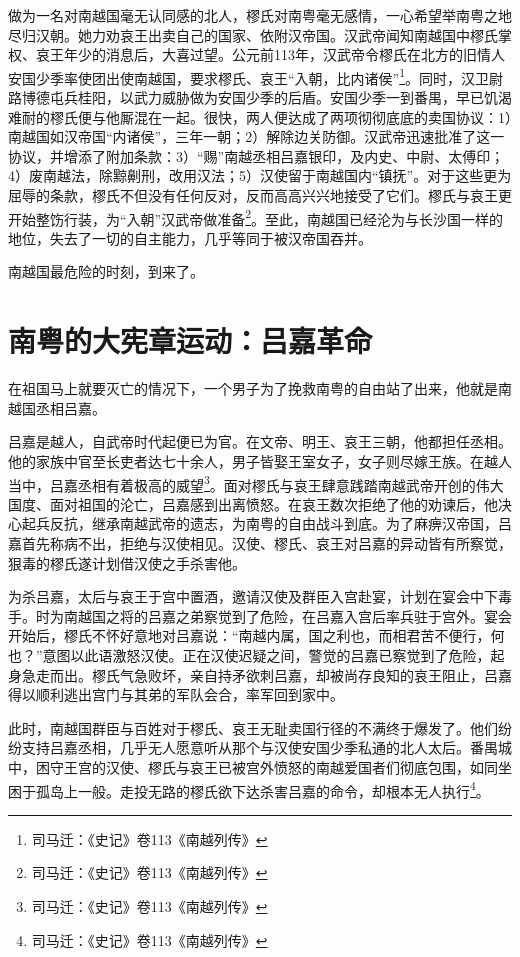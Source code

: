 做为一名对南越国毫无认同感的北人，樛氏对南粤毫无感情，一心希望举南粤之地尽归汉朝。她力劝哀王出卖自己的国家、依附汉帝国。汉武帝闻知南越国中樛氏掌权、哀王年少的消息后，大喜过望。公元前113年，汉武帝令樛氏在北方的旧情人安国少季率使团出使南越国，要求樛氏、哀王“入朝，比内诸侯”\footnote{司马迁：《史记》卷113《南越列传》}。同时，汉卫尉路博德屯兵桂阳，以武力威胁做为安国少季的后盾。安国少季一到番禺，早已饥渴难耐的樛氏便与他厮混在一起。很快，两人便达成了两项彻彻底底的卖国协议：1）南越国如汉帝国“内诸侯”，三年一朝；2）解除边关防御。汉武帝迅速批准了这一协议，并增添了附加条款：3）“赐”南越丞相吕嘉银印，及内史、中尉、太傅印；4）废南越法，除黥劓刑，改用汉法；5）汉使留于南越国内“镇抚”。对于这些更为屈辱的条款，樛氏不但没有任何反对，反而高高兴兴地接受了它们。樛氏与哀王更开始整饬行装，为“入朝”汉武帝做准备\footnote{司马迁：《史记》卷113《南越列传》}。至此，南越国已经沦为与长沙国一样的地位，失去了一切的自主能力，几乎等同于被汉帝国吞并。

南越国最危险的时刻，到来了。

\section{南粤的大宪章运动：吕嘉革命}

\indent 在祖国马上就要灭亡的情况下，一个男子为了挽救南粤的自由站了出来，他就是南越国丞相吕嘉。

吕嘉是越人，自武帝时代起便已为官。在文帝、明王、哀王三朝，他都担任丞相。他的家族中官至长吏者达七十余人，男子皆娶王室女子，女子则尽嫁王族。在越人当中，吕嘉丞相有着极高的威望\footnote{司马迁：《史记》卷113《南越列传》}。面对樛氏与哀王肆意践踏南越武帝开创的伟大国度、面对祖国的沦亡，吕嘉感到出离愤怒。在哀王数次拒绝了他的劝谏后，他决心起兵反抗，继承南越武帝的遗志，为南粤的自由战斗到底。为了麻痹汉帝国，吕嘉首先称病不出，拒绝与汉使相见。汉使、樛氏、哀王对吕嘉的异动皆有所察觉，狠毒的樛氏遂计划借汉使之手杀害他。

为杀吕嘉，太后与哀王于宫中置酒，邀请汉使及群臣入宫赴宴，计划在宴会中下毒手。时为南越国之将的吕嘉之弟察觉到了危险，在吕嘉入宫后率兵驻于宫外。宴会开始后，樛氏不怀好意地对吕嘉说：“南越内属，国之利也，而相君苦不便行，何也？”意图以此语激怒汉使。正在汉使迟疑之间，警觉的吕嘉已察觉到了危险，起身急走而出。樛氏气急败坏，亲自持矛欲刺吕嘉，却被尚存良知的哀王阻止，吕嘉得以顺利逃出宫门与其弟的军队会合，率军回到家中。

此时，南越国群臣与百姓对于樛氏、哀王无耻卖国行径的不满终于爆发了。他们纷纷支持吕嘉丞相，几乎无人愿意听从那个与汉使安国少季私通的北人太后。番禺城中，困守王宫的汉使、樛氏与哀王已被宫外愤怒的南越爱国者们彻底包围，如同坐困于孤岛上一般。走投无路的樛氏欲下达杀害吕嘉的命令，却根本无人执行\footnote{司马迁：《史记》卷113《南越列传》}。


